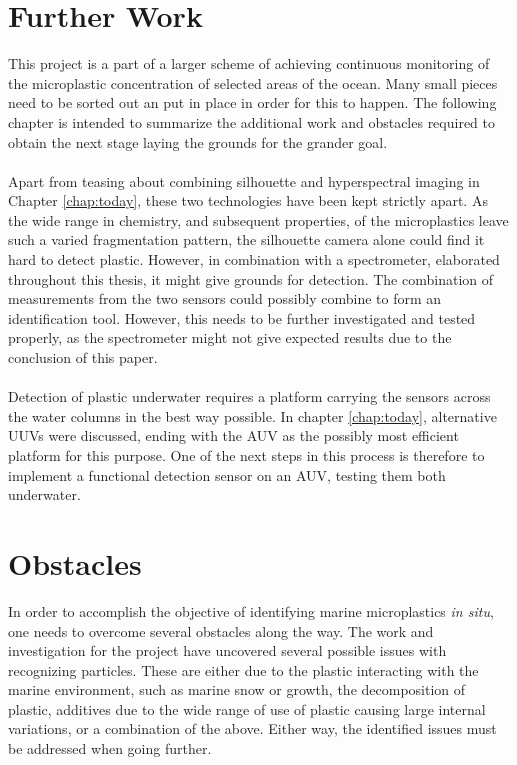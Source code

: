 \section{Further Work}
This project is a part of a larger scheme of achieving continuous monitoring of the microplastic concentration of selected areas of the ocean. Many small pieces need to be sorted out an put in place in order for this to happen. The following chapter is intended to summarize the additional work and obstacles required to obtain the next stage laying the grounds for the grander goal. 
\\\\
Apart from teasing about combining silhouette and hyperspectral imaging in Chapter \ref{chap:today}, these two technologies have been kept strictly apart. As the wide range in chemistry, and subsequent properties, of the microplastics leave such a varied fragmentation pattern, the silhouette camera alone could find it hard to detect plastic. However, in combination with a spectrometer, elaborated throughout this thesis, it might give grounds for detection. The combination of measurements from the two sensors could possibly combine to form an identification tool. However, this needs to be further investigated and tested properly, as the spectrometer might not give expected results due to the conclusion of this paper. 
\\\\
Detection of plastic underwater requires a platform carrying the sensors across the water columns in the best way possible. In chapter \ref{chap:today}, alternative UUVs were discussed, ending with the AUV as the possibly most efficient platform for this purpose. One of the next steps in this process is therefore to implement a functional detection sensor on an AUV, testing them both underwater.

\section{Obstacles}
In order to accomplish the objective of identifying marine microplastics \textit{in situ}, one needs to overcome several obstacles along the way. The work and investigation for the project have uncovered several possible issues with recognizing particles. These are either due to the plastic interacting with the marine environment, such as marine snow or growth, the decomposition of plastic, additives due to the wide range of use of plastic causing large internal variations, or a combination of the above. Either way, the identified issues must be addressed when going further.


